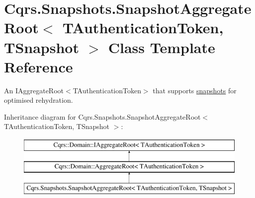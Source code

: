 \hypertarget{classCqrs_1_1Snapshots_1_1SnapshotAggregateRoot}{}\section{Cqrs.\+Snapshots.\+Snapshot\+Aggregate\+Root$<$ T\+Authentication\+Token, T\+Snapshot $>$ Class Template Reference}
\label{classCqrs_1_1Snapshots_1_1SnapshotAggregateRoot}


An I\+Aggregate\+Root$<$\+T\+Authentication\+Token$>$ that supports \hyperlink{classCqrs_1_1Snapshots_1_1Snapshot}{snapshots} for optimised rehydration.  


Inheritance diagram for Cqrs.\+Snapshots.\+Snapshot\+Aggregate\+Root$<$ T\+Authentication\+Token, T\+Snapshot $>$\+:\begin{figure}[H]
\begin{center}
\leavevmode
\includegraphics[height=3.000000cm]{classCqrs_1_1Snapshots_1_1SnapshotAggregateRoot}
\end{center}
\end{figure}
